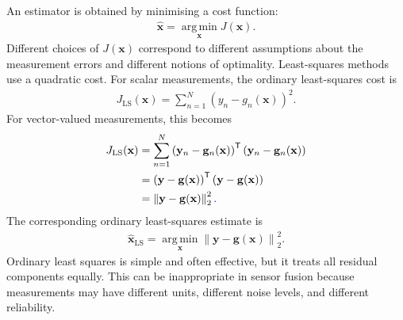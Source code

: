 \documentclass{ieeeaccess}
\begin{document}
An estimator is obtained by minimising a cost function:
\begin{align}
\widehat{\mathbf{x}} = \operatorname*{arg\,min}_{\mathbf{x}} J(\mathbf{x}).
\end{align}
Different choices of $J(\mathbf{x})$ correspond to different assumptions about the measurement errors and different notions of optimality. Least-squares methods use a quadratic cost. For scalar measurements, the ordinary least-squares cost is
\begin{align}
J_{\mathrm{LS}}(\mathbf{x}) = \sum_{n=1}^{N}\left(y_n-g_n(\mathbf{x})\right)^2.
\end{align}
For vector-valued measurements, this becomes
\begin{align}
J_{\mathrm{LS}}(\mathbf{x}) &=\sum_{n=1}^{N}\left(\mathbf{y}_n-\mathbf{g}_n(\mathbf{x})\right)^{\mathsf T}\left(\mathbf{y}_n-\mathbf{g}_n(\mathbf{x})\right) \nonumber \\
&= \left( \mathbf{y} - \mathbf{g}(\mathbf{x}) \right)^{\mathsf T}\left(\mathbf{y}-\mathbf{g}(\mathbf{x})\right) \nonumber \\
& = \left\|\mathbf{y} - \mathbf{g}(\mathbf{x}) \right\|_2^2 {\color{blue}.}
\end{align}
The corresponding ordinary least-squares estimate is
\begin{align}
\widehat{\mathbf{x}}_{\mathrm{LS}} = \operatorname*{arg\,min}_{\mathbf{x}} \left\| \mathbf{y} - \mathbf{g}(\mathbf{x}) \right\|_2^2.
\end{align}
Ordinary least squares is simple and often effective, but it treats all residual components equally. This can be inappropriate in sensor fusion because measurements may have different units, different noise levels, and different reliability.
\end{document}
